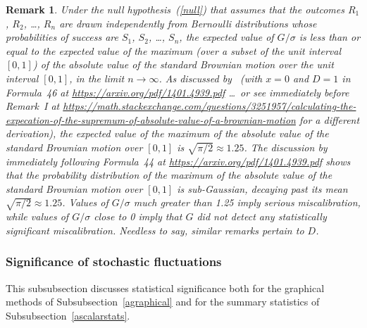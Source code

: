 \documentclass{article}
\newtheorem{remark1}[theorem]{Remark}
\newenvironment{remark}{\begin{remark1} \rm}{\end{remark1}}
\begin{document}
\begin{remark}
\label{proofs}
Under the null hypothesis~(\ref{null}) that assumes that the outcomes
$R_1$, $R_2$, \dots, $R_n$ are drawn independently from Bernoulli distributions
whose probabilities of success are $S_1$, $S_2$, \dots, $S_n$,
the expected value of $G/\sigma$ is less than or equal to
the expected value of the maximum (over a subset of the unit interval $[0, 1]$)
of the absolute value of the standard Brownian motion
over the unit interval $[0, 1]$, in the limit $n \to \infty$.
As discussed by~\cite{masoliver}
(with $x = 0$ and $D = 1$ in Formula~46 at
\url{https://arxiv.org/pdf/1401.4939.pdf}
\dots\ or see immediately before Remark~I at%
{\expandafter\def\expandafter\UrlBreaks\expandafter{\UrlBreaks\do\/\do-}
\url{https://math.stackexchange.com/questions/3251957/calculating-the-expecation-of-the-supremum-of-absolute-value-of-a-brownian-motion}}
for a different derivation),
the expected value of the maximum of the absolute value
of the standard Brownian motion over $[0, 1]$ is $\sqrt{\pi/2} \approx 1.25$.
The discussion by~\cite{masoliver} immediately following Formula~44
at \url{https://arxiv.org/pdf/1401.4939.pdf} shows that
the probability distribution of the maximum of the absolute value
of the standard Brownian motion over $[0, 1]$ is sub-Gaussian,
decaying past its mean $\sqrt{\pi/2} \approx 1.25$.
Values of $G/\sigma$ much greater than 1.25 imply serious miscalibration,
while values of $G/\sigma$ close to 0 imply that $G$ did not detect
any statistically significant miscalibration.
Needless to say, similar remarks pertain to $D$.
\end{remark}


\subsubsection{Significance of stochastic fluctuations}
\label{asignificance}

This subsubsection discusses statistical significance
both for the graphical methods of Subsubsection~\ref{agraphical}
and for the summary statistics of Subsubsection~\ref{ascalarstats}.
\end{document}
